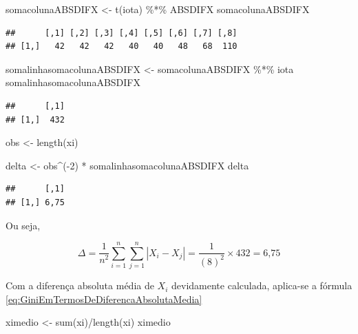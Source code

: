 \documentclass[
]{book}
\newenvironment{Shaded}{\begin{snugshade}}{\end{snugshade}}
\newcommand{\DecValTok}[1]{\textcolor[rgb]{0.00,0.00,0.81}{#1}}
\newcommand{\FunctionTok}[1]{\textcolor[rgb]{0.00,0.00,0.00}{#1}}
\newcommand{\NormalTok}[1]{#1}
\newcommand{\OtherTok}[1]{\textcolor[rgb]{0.56,0.35,0.01}{#1}}
\newcommand{\SpecialCharTok}[1]{\textcolor[rgb]{0.00,0.00,0.00}{#1}}
\begin{document}
\begin{Shaded}
\begin{Highlighting}[]
\NormalTok{somacolunaABSDIFX }\OtherTok{\textless{}{-}} \FunctionTok{t}\NormalTok{(iota) }\SpecialCharTok{\%*\%}\NormalTok{ ABSDIFX}
\NormalTok{somacolunaABSDIFX}
\end{Highlighting}
\end{Shaded}

\begin{verbatim}
##      [,1] [,2] [,3] [,4] [,5] [,6] [,7] [,8]
## [1,]   42   42   42   40   40   48   68  110
\end{verbatim}

\begin{Shaded}
\begin{Highlighting}[]
\NormalTok{somalinhasomacolunaABSDIFX }\OtherTok{\textless{}{-}}\NormalTok{ somacolunaABSDIFX }\SpecialCharTok{\%*\%} 
\NormalTok{    iota}
\NormalTok{somalinhasomacolunaABSDIFX}
\end{Highlighting}
\end{Shaded}

\begin{verbatim}
##      [,1]
## [1,]  432
\end{verbatim}

\begin{Shaded}
\begin{Highlighting}[]
\NormalTok{obs }\OtherTok{\textless{}{-}} \FunctionTok{length}\NormalTok{(xi)}

\NormalTok{delta }\OtherTok{\textless{}{-}}\NormalTok{ obs}\SpecialCharTok{\^{}}\NormalTok{(}\SpecialCharTok{{-}}\DecValTok{2}\NormalTok{) }\SpecialCharTok{*}\NormalTok{ somalinhasomacolunaABSDIFX}
\NormalTok{delta}
\end{Highlighting}
\end{Shaded}

\begin{verbatim}
##      [,1]
## [1,] 6,75
\end{verbatim}

Ou seja,

\[
\Delta = \dfrac{1}{n^2}\sum_{i=1}^{n}\sum_{j=1}^{n}|X_i - X_j| = \dfrac{1}{(\text{8})^2} \times \text{432} = \text{6,75}
\]

Com a diferença absoluta média de \(X_i\) devidamente calculada, aplica-se a fórmula \eqref{eq:GiniEmTermosDeDiferencaAbsolutaMedia}

\begin{Shaded}
\begin{Highlighting}[]
\NormalTok{ximedio }\OtherTok{\textless{}{-}} \FunctionTok{sum}\NormalTok{(xi)}\SpecialCharTok{/}\FunctionTok{length}\NormalTok{(xi)}
\NormalTok{ximedio}
\end{Highlighting}
\end{Shaded}
\end{document}
